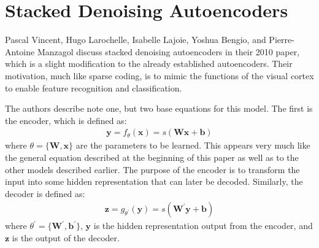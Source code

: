 \documentclass{article}
\newcommand{\vect}[1]{\mathbf{#1}}
\newcommand{\matr}[1]{\mathbf{#1}}
\newcommand{\vb}[0]{\vect{b}}
\newcommand{\vx}[0]{\vect{x}}
\newcommand{\vz}[0]{\vect{z}}
\newcommand{\vy}[0]{\vect{y}}
\newcommand{\mW}[0]{\matr{W}}
\begin{document}
\section {Stacked Denoising Autoencoders}

Pascal Vincent, Hugo Larochelle, Isabelle Lajoie, Yoshua Bengio, and Pierre-Antoine Manzagol discuss stacked denoising autoencoders in their 2010 paper, which is a slight modification to the already established autoencoders. Their motivation, much like sparse coding, is to mimic the functions of the visual cortex to enable feature recognition and classification. 

The authors describe note one, but two base equations for this model. The first is the encoder, which is defined as:
\begin{align*}
\vy = f_\theta (\vx) = s(\mW \vx + \vb)
\end{align*}
where $\theta = \{ \mW, \vx \}$ are the parameters to be learned. This appears very much like the general equation described at the beginning of this paper as well as to the other models described earlier. The purpose of the encoder is to transform the input into some hidden representation that can later be decoded. Similarly, the decoder is defined as:
\begin{align*}
\vz = g_{\theta^{'}} (\vy) = s(\mW^{'}  \vy + \vb)
\end{align*}
where $\theta^{'} = \{ \mW^{'}, \vb^{'} \}$, $\vy$ is the hidden representation output from the encoder, and $\vz$ is the output of the decoder. 

\newpage

\nocite{*}


\end{document}
